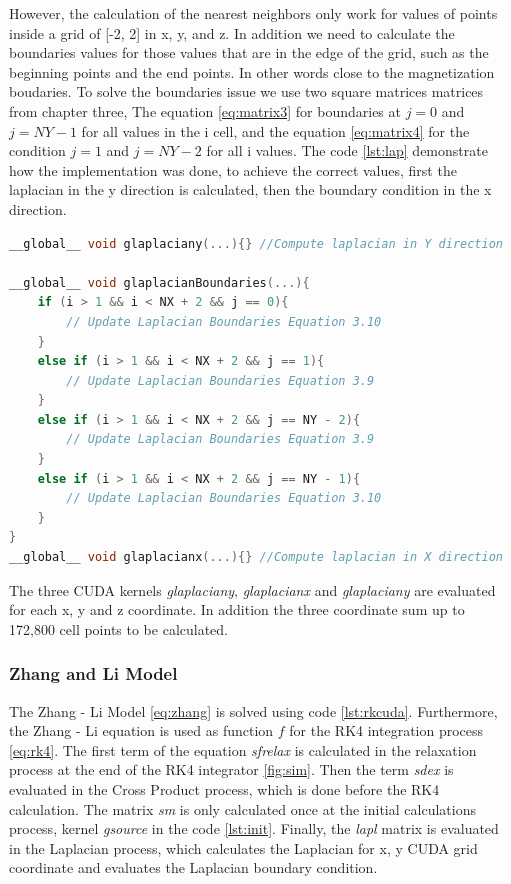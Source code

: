 However, the calculation of the nearest neighbors only work for values of points inside a grid of [-2, 2] in x, y, and z. In addition we need to calculate the boundaries values for those values that are in the edge of the grid, such as the beginning points and the end points. In other words close to the magnetization boudaries. To solve the boundaries issue we use two square matrices matrices from chapter three, The equation \ref{eq:matrix3} for boundaries at $j = 0$ and $j = NY - 1$ for all values in the i cell, and the equation \ref{eq:matrix4} for the condition $j = 1$ and $j = NY - 2$ for all i values. The code \ref{lst:lap} demonstrate how the implementation was done, to achieve the correct values, first the laplacian in the y direction is calculated, then the boundary condition in the x direction. 

\begin{lstlisting}[language=C++, label={lst:lap}, caption={Evaluation of Laplacian X, Y with boundary condition}]
__global__ void glaplaciany(...){} //Compute laplacian in Y direction

__global__ void glaplacianBoundaries(...){
    if (i > 1 && i < NX + 2 && j == 0){
     	// Update Laplacian Boundaries Equation 3.10
    }
    else if (i > 1 && i < NX + 2 && j == 1){
  		// Update Laplacian Boundaries Equation 3.9
    }
    else if (i > 1 && i < NX + 2 && j == NY - 2){
        // Update Laplacian Boundaries Equation 3.9
    }
    else if (i > 1 && i < NX + 2 && j == NY - 1){
        // Update Laplacian Boundaries Equation 3.10
    }
}
__global__ void glaplacianx(...){} //Compute laplacian in X direction
\end{lstlisting}

The three CUDA kernels \textit{glaplaciany}, \textit{glaplacianx} and \textit{glaplaciany} are evaluated for each x, y and z coordinate. In addition the three coordinate sum up to 172,800 cell points to be calculated.

\subsubsection{Zhang and Li Model}

The Zhang - Li Model \ref{eq:zhang} is solved using code \ref{lst:rkcuda}. Furthermore, the Zhang - Li equation is used as function $f$ for the RK4 integration process \ref{eq:rk4}. The first term of the equation \textit{sfrelax} is calculated in the relaxation process at the end of the RK4 integrator \ref{fig:sim}. Then the term \textit{sdex} is evaluated in the Cross Product process, which is done before the RK4 calculation. The matrix \textit{sm} is only calculated once at the initial calculations process, kernel \textit{gsource} in the code \ref{lst:init}. Finally, the \textit{lapl} matrix is evaluated in the Laplacian process, which calculates the Laplacian for x, y CUDA grid coordinate and evaluates the Laplacian boundary condition.

